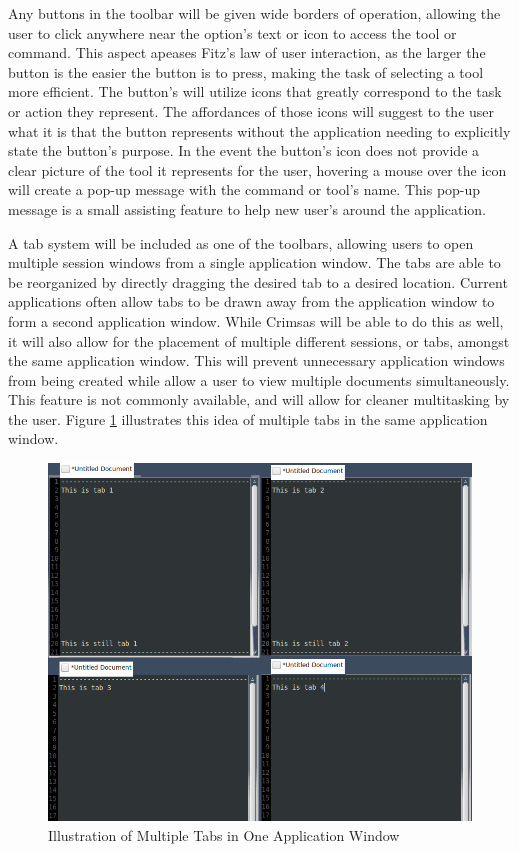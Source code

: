 \documentclass[11pt, oneside]{article}
\begin{document}
Any buttons in the toolbar will be given wide borders of operation, allowing the user to click anywhere near the option's text or icon to access the tool or command. This aspect apeases Fitz's law of user interaction, as the larger the button is the easier the button is to press, making the task of selecting a tool more efficient. The button's will utilize icons that greatly correspond to the task or action they represent. The affordances of those icons will suggest to the user what it is that the button represents without the application needing to explicitly state the button's purpose. In the event the button's icon does not provide a clear picture of the tool it represents for the user, hovering a mouse over the icon will create a pop-up message with the command or tool's name. This pop-up message is a small assisting feature to help new user's around the application.

A tab system will be included as one of the toolbars, allowing users to open multiple session windows from a single application window. The tabs are able to be reorganized by directly dragging the desired tab to a desired location. Current applications often allow tabs to be drawn away from the application window to form a second application window. While Crimsas will be able to do this as well, it will also allow for the placement of multiple different sessions, or tabs, amongst the same application window. This will prevent unnecessary application windows from being created while allow a user to view multiple documents simultaneously. This feature is not commonly available, and will allow for cleaner multitasking by the user. Figure \ref{multitasking_tabs} illustrates this idea of multiple tabs in the same application window.

\begin{figure}
    \centering
    \includegraphics[width=.8\textwidth]{photos/multitasking_tabs.png}
    \caption{Illustration of Multiple Tabs in One Application Window}
    \label{multitasking_tabs}
\end{figure}
\end{document}
